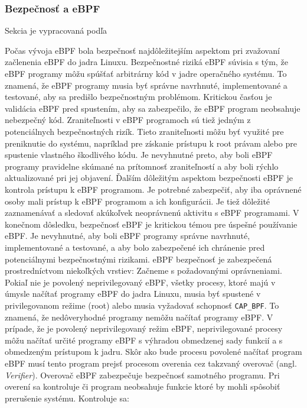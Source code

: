 \subsubsection{Bezpečnosť a eBPF}
Sekcia je vypracovaná podľa~\cite{eBPF}

Počas vývoja eBPF bola bezpečnosť najdôležitejším aspektom pri zvažovaní začlenenia eBPF do jadra Linuxu. 
Bezpečnostné riziká eBPF súvisia s tým, že eBPF programy môžu spúšťať arbitrárny kód v jadre operačného systému. 
To znamená, že eBPF programy musia byť správne navrhnuté, implementované a testované, aby sa predišlo bezpečnostným problémom. 
Kritickou časťou je validácia eBPF pred spustením, aby sa zabezpečilo, že eBPF program neobsahuje nebezpečný kód. 
Zraniteľnosti v eBPF programoch sú tiež jedným z potenciálnych bezpečnostných rizík. Tieto zraniteľnosti môžu byť využité pre preniknutie do systému, 
napríklad pre získanie prístupu k root právam alebo pre spustenie vlastného škodlivého kódu. Je nevyhnutné preto, 
aby boli eBPF programy pravidelne skúmané na prítomnosť zraniteľností a aby boli rýchlo aktualizované pri jej objavení. 
Ďalším dôležitým aspektom bezpečnosti eBPF je kontrola prístupu k eBPF programom. Je potrebné zabezpečiť, aby iba oprávnené osoby 
mali prístup k eBPF programom a ich konfigurácii. Je tiež dôležité zaznamenávať a sledovať akúkoľvek neoprávnenú aktivitu s eBPF programami. 
V konečnom dôsledku, bezpečnosť eBPF je kritickou témou pre úspešné používanie eBPF. Je nevyhnutné, aby boli eBPF programy 
správne navrhnuté, implementované a testované, a aby bolo zabezpečené ich chránenie pred potenciálnymi bezpečnostnými rizikami.
eBPF bezpečnosť je zabezpečená prostredníctvom niekoľkých vrstiev:
Začneme s požadovanými oprávneniami. Pokiaľ nie je povolený neprivilegovaný eBPF, všetky procesy, ktoré majú v úmysle načítať programy 
eBPF do jadra Linuxu, musia byť spustené v privilegovanom režime (root) alebo musia vyžadovať schopnosť \texttt{CAP\_BPF}. 
To znamená, že nedôveryhodné programy nemôžu načítať programy eBPF. V prípade, že je povolený neprivilegovaný režim eBPF, 
neprivilegované procesy môžu načítať určité programy eBPF s výhradou obmedzenej sady funkcií a s obmedzeným prístupom k jadru. 
Skôr ako bude procesu povolené načítať program eBPF musí tento program prejsť procesom overenia cez takzvaný overovač (angl. \emph{Verifier}). 
Overovač eBPF zabezpečuje bezpečnosť samotného programu. Pri overení sa kontroluje či program neobsahuje funkcie ktoré by mohli spôsobiť prerušenie systému. 
Kontroluje sa: 
